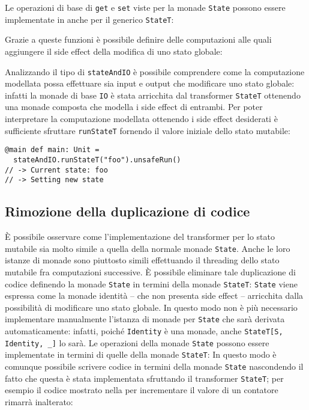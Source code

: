 Le operazioni di base di \lstinline{get} e \lstinline{set} viste per la monade \lstinline{State} possono essere implementate in anche per il generico \lstinline{StateT}:

Grazie a queste funzioni è possibile definire delle computazioni alle quali aggiungere il side effect della modifica di uno stato globale:

Analizzando il tipo di \lstinline{stateAndIO} è possibile comprendere come la computazione modellata possa effettuare sia input e output che modificare uno stato globale: infatti la monade di base \lstinline{IO} è stata arricchita dal transformer \lstinline{StateT} ottenendo una monade composta che modella i side effect di entrambi.
Per poter interpretare la computazione modellata ottenendo i side effect desiderati è sufficiente sfruttare \lstinline{runStateT} fornendo il valore iniziale dello stato mutabile:
\begin{lstlisting}[language=scala3]
@main def main: Unit =
  stateAndIO.runStateT("foo").unsafeRun()
// -> Current state: foo
// -> Setting new state
\end{lstlisting}

\subsection{Rimozione della duplicazione di codice}
È possibile osservare come l'implementazione del transformer per lo stato mutabile sia molto simile a quella della normale monade \lstinline{State}. Anche le loro istanze di monade sono piuttosto simili effettuando il threading dello stato mutabile fra computazioni successive. È possibile eliminare tale duplicazione di codice definendo la monade \lstinline{State} in termini della monade \lstinline{StateT}:
\lstinline{State} viene espressa come la monade identità -- che non presenta side effect -- arricchita dalla possibilità di modificare uno stato globale. In questo modo non è più necessario implementare manualmente l'istanza di monade per \lstinline{State} che sarà derivata automaticamente: infatti, poiché \lstinline{Identity} è una monade, anche \lstinline{StateT[S, Identity, _]} lo sarà.
Le operazioni della monade \lstinline{State} possono essere implementate in termini di quelle della monade \lstinline{StateT}:
In questo modo è comunque possibile scrivere codice in termini della monade \lstinline{State} nascondendo il fatto che questa è stata implementata sfruttando il transformer \lstinline{StateT}; per esempio il codice mostrato nella  per incrementare il valore di un contatore rimarrà inalterato:

